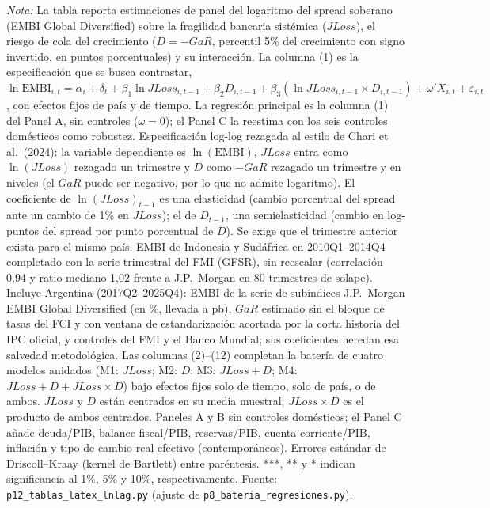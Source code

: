 \documentclass[11pt]{article}
\begin{document}
\begin{landscape}
\begin{table}
\par\smallskip\parbox{\linewidth}{\scriptsize \textit{Nota:} La tabla reporta estimaciones de panel del logaritmo del spread soberano (EMBI Global Diversified) sobre la fragilidad bancaria sistémica ($JLoss$), el riesgo de cola del crecimiento ($D=-GaR$, percentil 5\% del crecimiento con signo invertido, en puntos porcentuales) y su interacción. La columna (1) es la especificación que se busca contrastar, $\ln\mathrm{EMBI}_{i,t}=\alpha_i+\delta_t+\beta_1\ln JLoss_{i,t-1}+\beta_2 D_{i,t-1}+\beta_3(\ln JLoss_{i,t-1}\times D_{i,t-1})+\omega'X_{i,t}+\varepsilon_{i,t}$, con efectos fijos de país y de tiempo. La regresión principal es la columna (1) del Panel A, sin controles ($\omega=0$); el Panel C la reestima con los seis controles domésticos como robustez. Especificación log-log rezagada al estilo de Chari et al.\ (2024): la variable dependiente es $\ln(\mathrm{EMBI})$, $JLoss$ entra como $\ln(JLoss)$ rezagado un trimestre y $D$ como $-GaR$ rezagado un trimestre y en niveles (el $GaR$ puede ser negativo, por lo que no admite logaritmo). El coeficiente de $\ln(JLoss)_{t-1}$ es una elasticidad (cambio porcentual del spread ante un cambio de 1\% en $JLoss$); el de $D_{t-1}$, una semielasticidad (cambio en log-puntos del spread por punto porcentual de $D$). Se exige que el trimestre anterior exista para el mismo país. EMBI de Indonesia y Sudáfrica en 2010Q1--2014Q4 completado con la serie trimestral del FMI (GFSR), sin reescalar (correlación 0,94 y ratio mediano 1,02 frente a J.P.\ Morgan en 80 trimestres de solape). Incluye Argentina (2017Q2--2025Q4): EMBI de la serie de subíndices J.P.\ Morgan EMBI Global Diversified (en \%, llevada a pb), $GaR$ estimado sin el bloque de tasas del FCI y con ventana de estandarización acortada por la corta historia del IPC oficial, y controles del FMI y el Banco Mundial; sus coeficientes heredan esa salvedad metodológica. Las columnas (2)--(12) completan la batería de cuatro modelos anidados (M1: $JLoss$; M2: $D$; M3: $JLoss+D$; M4: $JLoss+D+JLoss\times D$) bajo efectos fijos solo de tiempo, solo de país, o de ambos. $JLoss$ y $D$ están centrados en su media muestral; $JLoss\times D$ es el producto de ambos centrados. Paneles A y B sin controles domésticos; el Panel C añade deuda/PIB, balance fiscal/PIB, reservas/PIB, cuenta corriente/PIB, inflación y tipo de cambio real efectivo (contemporáneos). Errores estándar de Driscoll--Kraay (kernel de Bartlett) entre paréntesis. ***, ** y * indican significancia al 1\%, 5\% y 10\%, respectivamente. Fuente: \texttt{p12\_tablas\_latex\_lnlag.py} (ajuste de \texttt{p8\_bateria\_regresiones.py}).}
\end{table}
\end{landscape}
\end{document}

